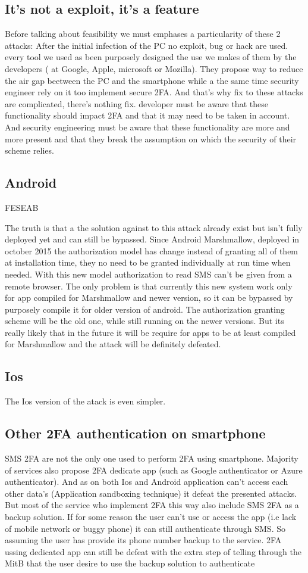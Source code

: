 \documentclass[11pt, a4paper,twocolumn]{article}
\begin{document}
\subsection{It's not a exploit, it's a feature}
Before talking about feasibility we must emphases a particularity of these 2 attacks: After the initial infection of the PC no exploit, bug or hack are used. every tool we used as been purposely designed the use we makes of them by the developers ( at Google, Apple, microsoft or Mozilla). They propose way to reduce the air gap beetween the PC and the smartphone while a the same time security engineer rely on it too implement secure 2FA. And that's why fix to these attacks are complicated, there's nothing fix. developer must be aware that these functionality should impact 2FA and that it may need to be taken in account. And security engineering must be aware that these functionality are more and more present and that they break the assumption on which the security of their scheme relies.
\subsection{Android}
FESEAB

The truth is that a the solution against to this attack already exist but isn't fully deployed yet and can still be bypassed. Since Android Marshmallow, deployed in october 2015 the authorization model has change instead of granting all of them at installation time, they no need to be granted individually at run time when needed. With this new model authorization to read SMS can't be given from a remote browser. The only problem is that currently this new system work only for app compiled for Marshmallow and newer version, so it can be bypassed by purposely compile it for older version of android. The authorization granting scheme will be the old one, while still running on the newer versions. But its really likely that in the future it will be require for apps to be at least compiled for Marshmallow and the attack will be definitely defeated.
\subsection{Ios}
The Ios version of the atack is even simpler. 

\subsection{Other 2FA authentication on smartphone}
SMS 2FA are not the only one used to perform 2FA using smartphone. Majority of services also propose 2FA dedicate app (such as Google authenticator or Azure authenticator). And as on both Ios and Android application can't access each other data's (Application sandboxing technique) it defeat the presented attacks. But most of the service who implement 2FA this way also include SMS 2FA as a backup solution. If for some reason the user can't use or access the app (i.e lack of mobile network or buggy phone) it can still authenticate through SMS. So assuming the user has provide its phone number backup to the service. 2FA ussing dedicated app can still be defeat with the extra step of telling through the MitB that the user desire to use the backup solution to authenticate
\end{document}
